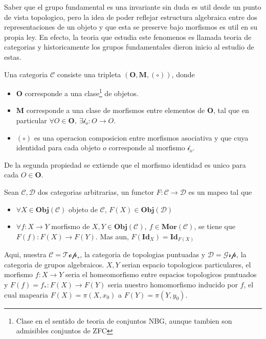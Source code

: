 {Saber que el grupo fundamental es una invariante sin duda es util
desde un punto de vista topologico, pero la idea de poder reflejar
estructura algebraica entre dos representaciones de un objeto y que esta
se preserve bajo morfismos es util en su propia ley. En efecto, la
teoria que estudia este fenomenos es llamada teoria de categorias y
historicamente los grupos fundamentales dieron inicio al estudio de
estas.
\begin{definicion}
  Una categoria \(\mathcal C\) consiste una tripleta \(( \mathbf O,
  \mathbf M, (\circ))\), donde
  \begin{itemize}
    \item \(\mathbf O\) corresponde a una clase\footnote{Clase en el sentido de
        teoria de conjuntos NBG, aunque tambien son admisibles conjuntos
        de ZFC} de objetos.
    \item \(\mathbf M\) corresponde a una clase de morfismos
      entre elementos de \(\mathbf O\), tal que en particular \(\forall
      O \in \mathbf O,\ \exists \mathcal i _o : O \to O\).
    \item \((\circ)\) es una operacion composicion entre morfismos
      asociativa y que cuya identidad para cada objeto \(o\) corresponde al
      morfismo \(\mathcal i _o\).
  \end{itemize}
\end{definicion}
De la segunda propiedad se extiende que el morfismo identidad es unico
para cada \(O \in \mathbf O\).
\begin{definicion}
  Sean \(\mathscr{C} , \mathscr D\) dos categorias arbitrarias, un
  functor \(F : \mathscr C \to \mathscr D\) es un mapeo tal que
  \begin{itemize}
  \item \(\forall X \in \mathbf{Obj}(\mathscr C)\) objeto de \(\mathscr
    C\), \( F(X) \in \mathbf{Obj} (\mathscr D)\)
  \item  \(\forall f : X \to Y\) morfismo de \(X,Y \in \mathbf{Obj}
    (\mathscr C),\ f \in \mathbf{Mor} (\mathscr C)\), se tiene que \(
    F(f) : F(X) \to F(Y) \). Mas aun, \(F (\mathbf{Id}_X) = \mathbf{Id}_{F(X)}\)
  \end{itemize}
\end{definicion}
Aqui, nuestra \(\mathscr C = \mathscr{Top_{*}}\), la categoria de
topologias puntuadas y \(\mathscr D = \mathscr{Grp}\), la categoria de
grupos algebraicos. \(X,Y\) serian espacio topologicos particulares, el
morfismo \(f : X \to Y\) seria el homeomorfismo entre espacios
topologicos puntuados y \(F(f) = f_{*} : F(X) \to F(Y)\) seria nuestro
homomorfismo inducido por \(f\), el cual mapearia \(F(X) = \pi (X,
x_0)\) a \(F(Y) = \pi (Y, y_0) \).
}